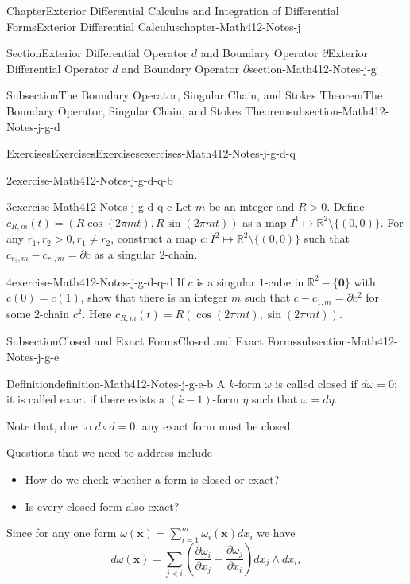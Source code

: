 \documentclass[oneside,10pt,]{book}
\numberwithin{equation}{section}
\newcommand{\bx}{\mathbf{x}}
\newcommand{\bbR}{\mathbb{R}}
\begin{document}
\begin{chapterptx}{Chapter}{Exterior Differential Calculus and Integration of Differential Forms}{}{Exterior Differential Calculus}{}{}{chapter-Math412-Notes-j}
\begin{sectionptx}{Section}{Exterior Differential Operator \(d\) and Boundary Operator \(\partial\)}{}{Exterior Differential Operator \(d\) and Boundary Operator \(\partial\)}{}{}{section-Math412-Notes-j-g}
\begin{subsectionptx}{Subsection}{The Boundary Operator, Singular Chain, and Stokes Theorem}{}{The Boundary Operator, Singular Chain, and Stokes Theorem}{}{}{subsection-Math412-Notes-j-g-d}
\begin{exercises-subsubsection-numberless}{Exercises}{Exercises}{}{Exercises}{}{}{exercises-Math412-Notes-j-g-d-q}
\begin{divisionexercise}{2}{}{}{exercise-Math412-Notes-j-g-d-q-b}
\end{divisionexercise}%
\begin{divisionexercise}{3}{}{}{exercise-Math412-Notes-j-g-d-q-c}%
Let \(m\) be an integer and \(R >0\). Define \(c_{R,m}(t)=(R\cos(2\pi m t), R\sin (2\pi m t))\) as a map \(I^{1}\mapsto \bbR^{2}\setminus\{(0, 0)\}\). For any \(r_{1}, r_{2}>0, r_{1}\ne r_{2}\), construct a map \(c:I^{2}\mapsto \bbR^{2}\setminus\{(0, 0)\}\) such that \(c_{r_{2},m}-c_{r_{1},m}=\partial c\) as a singular \(2\)-chain.%
\end{divisionexercise}%
\begin{divisionexercise}{4}{}{}{exercise-Math412-Notes-j-g-d-q-d}%
If \(c\) is a singular \(1\)-cube in \(\bbR^{2} -\{ \mathbf 0\}\) with \(c(0) = c(1)\), show that there is an integer \(m\) such that \(c - c_{1,m} = \partial c^{2}\) for some \(2\)-chain \(c^{2}\). Here \(c_{R, m}(t)=R(\cos(2\pi m t), \sin (2\pi m t))\).%
\end{divisionexercise}%
\end{exercises-subsubsection-numberless}
\end{subsectionptx}
%
%
\typeout{************************************************}
\typeout{************************************************}
%
\begin{subsectionptx}{Subsection}{Closed and Exact Forms}{}{Closed and Exact Forms}{}{}{subsection-Math412-Notes-j-g-e}
\begin{definition}{Definition}{}{definition-Math412-Notes-j-g-e-b}%
A \(k\)-form \(\omega\) is called closed if \(d\omega=0\); it is called exact if there exists a \((k-1)\)-form \(\eta\) such that \(\omega=d\eta\).\end{definition}
Note that, due to \(d\circ d=0\), any exact form must be closed.%
\par
Questions that we need to address include%
\begin{itemize}[label=\textbullet]
\item{}How do we check whether a form is closed or exact?%
\item{}Is every closed form also exact?%
\end{itemize}
%
\par
Since for any one form \(\omega(\bx)=\sum_{i=1}^{m}\omega_{i}(\bx)dx_{i}\) we have%
\begin{equation*}
d\omega(\bx)=\sum_{j < i}  
\left( \frac{\partial \omega_{i}}{\partial x_j} -  \frac{\partial \omega_{j}}{\partial x_{i}} \right) 
dx_{j} \wedge dx_{i},

\end{equation*}
\end{subsectionptx}
\end{sectionptx}
\end{chapterptx}
\end{document}
